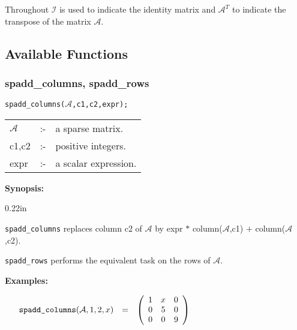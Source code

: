 Throughout $\mathcal{I}$ is used to indicate the identity matrix and 
$\mathcal{A}^T$ to indicate the transpose of the matrix $\mathcal{A}$.

\subsection{Available Functions}

\subsubsection{spadd\_columns, spadd\_rows}

\hspace*{0.175in} \texttt{spadd\_columns($\mathcal{A}$,c1,c2,expr);} 

\hspace*{0.1in}
\begin{tabular}{l l l}
$\mathcal{A}$ & :- & a sparse matrix. \\
c1,c2      & :- & positive integers. \\
expr       & :- & a scalar expression. 
\end{tabular}

\textbf{Synopsis:}

\begin{addtolength}{\leftskip}{0.22in}
\parbox[t]{0.95\linewidth}{\texttt{spadd\_columns} replaces column c2 of 
$\mathcal{A}$ by expr $*$ column($\mathcal{A}$,c1) $+$ column($\mathcal{A}$,c2).}

\texttt{spadd\_rows} performs the equivalent task on the rows of $\mathcal{A}$.

\end{addtolength}

\textbf{Examples:}

\begin{flushleft}
\begin{math}
\hspace*{0.16in}
\begin{array}{ccc}
\texttt{spadd\_columns}(\mathcal{A},1,2,x) & = & 
\left( \begin{array}{ccc} 1 & x & 0 \\ 0 & 5 & 0 \\ 0 & 0 & 9
\end{array} \right)  
\end{array}
\end{math}
\end{flushleft}

\vspace*{0.1in}

